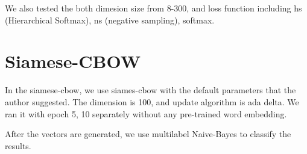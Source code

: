 We also tested the both dimesion size from 8-300, and loss function including hs (Hierarchical Softmax), ns (negative sampling), softmax.


\section{Siamese-CBOW}

In the siamese-cbow, we use siames-cbow with the default parameters that the author suggested. 
The dimension is 100, and update algorithm is ada delta. 
We ran it with epoch 5, 10 separately without any pre-trained word embedding. 

After the vectors are generated, we use multilabel Naive-Bayes to classify the results.
